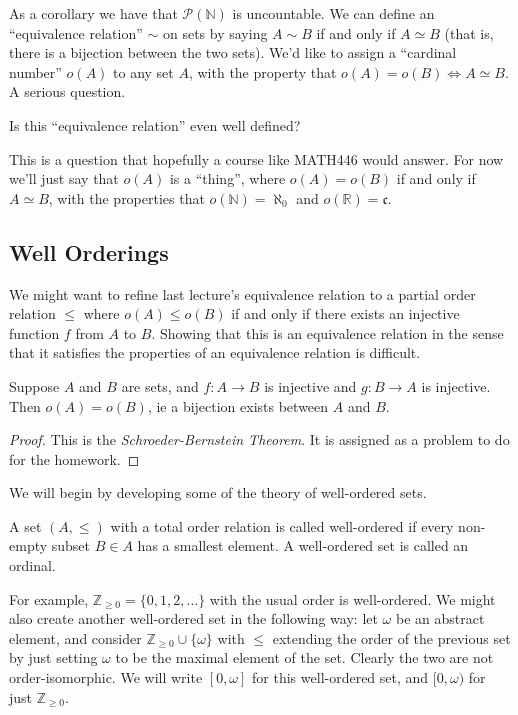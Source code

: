 As a corollary we have that $\mathcal{P}(\mathbb{N})$ is uncountable.
We can define an ``equivalence relation'' $\sim$ on sets by saying $A \sim B$ if and only if $A \simeq B$ (that is, there is a bijection between the two sets). We'd like to assign a ``cardinal number'' $o(A)$ to any set $A$, with the property that $o(A) = o(B) \iff A \simeq B$. A serious question.

\begin{question}
Is this ``equivalence relation'' even well defined? 
\end{question}

This is a question that hopefully a course like MATH446 would answer. For now we'll just say that $o(A)$ is a ``thing'', where $o(A) = o(B)$ if and only if $A \simeq B$, with the properties that $o(\mathbb{N}) = \aleph_0$ and $o(\mathbb{R}) = \mathfrak{c}$. 

\subsection{Well Orderings}

We might want to refine last lecture's equivalence relation to a partial order relation $\leq$ where $o(A) \leq o(B)$ if and only if there exists an injective function $f$ from $A$ to $B$. Showing that this is an equivalence relation in the sense that it satisfies the properties of an equivalence relation is difficult.

\begin{theorem}
Suppose $A$ and $B$ are sets, and $f: A\to B$ is injective and $g: B \to A$ is injective. Then $o(A) = o(B)$, ie a bijection exists between $A$ and $B$.
\end{theorem}
\begin{proof}
This is the \textit{Schroeder-Bernstein Theorem}. It is assigned as a problem to do for the homework.
\end{proof}

We will begin by developing some of the theory of well-ordered sets.

\begin{definition}
	A set $(A, \leq)$ with a total order relation is called well-ordered if every non-empty subset $B \in A$ has a smallest element. A well-ordered set is called an ordinal.
\end{definition}

For example, $\mathbb{Z}_{\geq 0} = \{0, 1, 2, \dots\}$ with the usual order is well-ordered. We might also create another well-ordered set in the following way: let $\omega$ be an abstract element, and consider $\mathbb{Z}_{\geq 0} \cup \{\omega\}$ with $\leq$ extending the order of the previous set by just setting $\omega$ to be the maximal element of the set. Clearly the two are not order-isomorphic. We will write $[0, \omega]$ for this well-ordered set, and $[0, \omega)$ for just $\mathbb{Z}_{\geq 0}$.

